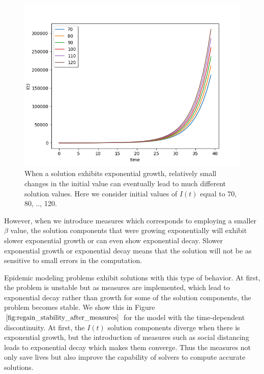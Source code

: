 \begin{figure}[H]
\centering
\includegraphics[width=0.7\linewidth]{./figures/unstability_of_exponential_growth}
\caption{When a solution exhibits exponential growth, relatively small changes in the initial value can eventually lead to much different solution values. Here we consider initial values of $I(t)$ equal to 70, 80, .., 120.}
\label{fig:unstability_of_exponential_growth}
\end{figure}

However, when we introduce measures which corresponds to employing a smaller $\beta$ value, the solution components that were growing exponentially will exhibit slower exponential growth or can even show exponential decay. Slower exponential growth or exponential decay means that the solution will not be as sensitive to small errors in the computation. 

Epidemic modeling problems exhibit solutions with this type of behavior. At first, the problem is unstable but as measures are implemented, which lead to exponential decay rather than growth for some of the solution components, the problem becomes stable. We show this in Figure $\ref{fig:regain_stability_after_measures}$ for the model with the time-dependent discontinuity. At first, the $I(t)$ solution components diverge when there is exponential growth, but the introduction of measures such as social distancing leads to exponential decay which makes them converge. Thus the measures not only save lives but also improve the capability of solvers to compute accurate solutions.

